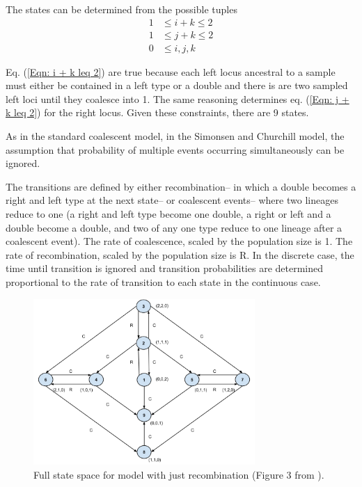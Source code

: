 \documentclass[11pt,oneside]{amsart}
\begin{document}
The states can be determined from the possible tuples
\begin{align}
1 &\leq i+k \leq 2 \label{Eqn: i + k leq 2} \\
1 &\leq j+k \leq 2 \label{Eqn: j + k leq 2}  \\
0 &\leq i,j,k \label{Eqn: all geq 0}
\end{align}

Eq. (\ref{Eqn: i + k leq 2}) are true because each left locus ancestral to a sample must either be contained in a left type or a double and there is are two sampled left loci until they coalesce into 1. The same reasoning determines eq. (\ref{Eqn: j + k leq 2}) for the right locus. Given these constraints, there are 9 states.

As in the standard coalescent model, in the Simonsen and Churchill model, the assumption that probability of multiple events occurring simultaneously can be ignored. 

The transitions are defined by either recombination-- in which a double becomes a right and left type at the next state-- or coalescent events-- where two lineages reduce to one (a right and left type become one double, a right or left and a double become a double, and two of any one type reduce to one lineage after a coalescent event). The rate of coalescence, scaled by the population size is 1. The rate of recombination, scaled by the population size is R. In the discrete case, the time until transition is ignored and transition probabilities are determined proportional to the rate of transition to each state in the continuous case.

\begin{figure}[ht]
\centering
\includegraphics[width=0.75\textwidth]{Markov_recomb.png}
\caption{Full state space for model with just recombination (Figure 3 from \cite{SimonsenChurchill1997}).}
\label{Figure: recomb}
\end{figure}
	
\end{document}

